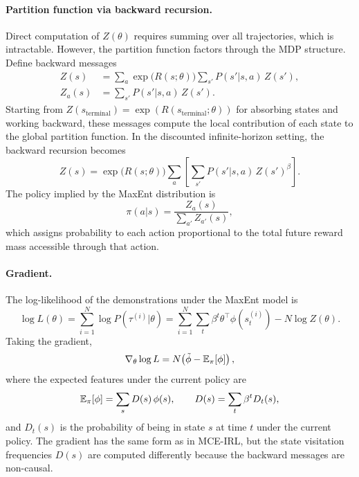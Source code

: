 \documentclass[10pt]{article}
\begin{document}
\paragraph{Partition function via backward recursion.}
Direct computation of $Z(\theta)$ requires summing over all trajectories, which is intractable. However, the partition function factors through the MDP structure. Define backward messages
\begin{align}
Z(s) &= \sum_a \exp\!\bigl(R(s;\theta)\bigr) \sum_{s'} P(s'|s,a)\, Z(s'), \label{eq:backward_z} \\
Z_a(s) &= \sum_{s'} P(s'|s,a)\, Z(s'). \label{eq:backward_za}
\end{align}
Starting from $Z(s_{\text{terminal}}) = \exp(R(s_{\text{terminal}};\theta))$ for absorbing states and working backward, these messages compute the local contribution of each state to the global partition function. In the discounted infinite-horizon setting, the backward recursion becomes
\begin{equation}
\label{eq:backward_discount}
Z(s) = \exp\!\bigl(R(s;\theta)\bigr) \sum_a \left[\sum_{s'} P(s'|s,a)\, Z(s')^{\beta}\right].
\end{equation}
The policy implied by the MaxEnt distribution is
\begin{equation}
\label{eq:maxent_policy}
\pi(a|s) = \frac{Z_a(s)}{\sum_{a'} Z_{a'}(s)},
\end{equation}
which assigns probability to each action proportional to the total future reward mass accessible through that action.

\paragraph{Gradient.}
The log-likelihood of the demonstrations under the MaxEnt model is
\begin{equation}
\log L(\theta) = \sum_{i=1}^N \log P(\tau^{(i)}|\theta) = \sum_{i=1}^N \sum_t \beta^t \theta^\top \phi(s_t^{(i)}) - N \log Z(\theta).
\end{equation}
Taking the gradient,
\begin{equation}
\label{eq:maxent_gradient}
\nabla_\theta \log L = N\!\left(\tilde\phi - \mathbb{E}_\pi[\phi]\right),
\end{equation}
where the expected features under the current policy are
\begin{equation}
\mathbb{E}_\pi[\phi] = \sum_s D(s)\, \phi(s), \qquad D(s) = \sum_t \beta^t D_t(s),
\end{equation}
and $D_t(s)$ is the probability of being in state $s$ at time $t$ under the current policy. The gradient has the same form as in MCE-IRL, but the state visitation frequencies $D(s)$ are computed differently because the backward messages are non-causal.
\end{document}
